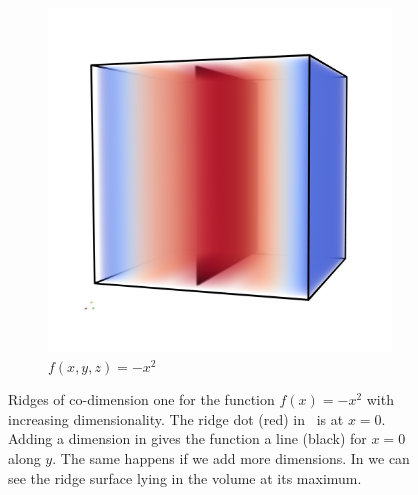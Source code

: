 \begin{figure}[t]
\begin{subfigure}[b]{0.33\textwidth}
    \label{fig:ridge2D}
  \end{subfigure}
  \begin{subfigure}[b]{0.33\textwidth}
    \includegraphics[width=\textwidth]{Images/func3D.png}
    \caption{$f(x,y,z)= -x^2$}
    \label{fig:ridge3D}
  \end{subfigure}
  \caption{Ridges of co-dimension one for the function $f(x)=-x^2$ with
  increasing dimensionality. The ridge dot (red) in~
  is at $x=0$. Adding a dimension in  gives the
  function a line (black) for $x=0$ along $y$. The same happens if we add
  more dimensions. In  we can see the ridge surface
  lying in the volume at its maximum.}
\end{figure}

